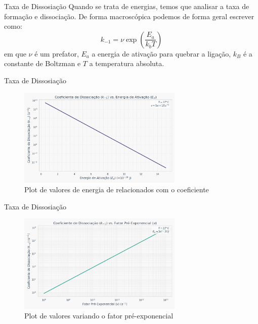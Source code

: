 \documentclass[aspectratio=169]{beamer}
\begin{document}
\begin{frame}{Taxa de Dissosiação}
    Quando se trata de energias, temos que analisar a taxa de formação e dissociação.
    De forma macroscópica podemos de forma geral escrever como:
    \begin{equation}
    k_{-1} = \nu \exp \left( \frac{E_{a}}{k_{b} T}\right) \label{eq:disso-k}
    \end{equation}
    em que $\nu$ é um prefator, $E_{a}$ a energia de ativação para quebrar a ligação, $k_{B}$
    é a constante de Boltzman e $T$ a temperatura absoluta.
\end{frame}

\begin{frame}{Taxa de Dissosiação}
    \begin{figure}
        \includegraphics[width=0.7\textwidth]{img/coef_diss_energia.png}
        \caption{Plot de valores de energia de relacionados com o coeficiente}
    \end{figure}
\end{frame}

\begin{frame}{Taxa de Dissosiação}
    \begin{figure}
        \includegraphics[width=0.7\textwidth]{img/coef_diss_fatorpre.png}
        \caption{Plot de valores variando o fator pré-exponencial}
    \end{figure}
\end{frame}
\end{document}
